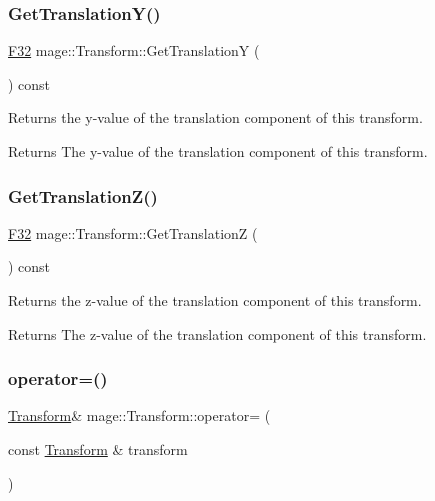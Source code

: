 \subsubsection{\texorpdfstring{Get\+Translation\+Y()}{GetTranslationY()}}
{\footnotesize\ttfamily \hyperlink{namespacemage_aa97e833b45f06d60a0a9c4fc22ae02c0}{F32} mage\+::\+Transform\+::\+Get\+TranslationY (\begin{DoxyParamCaption}{ }\end{DoxyParamCaption}) const\hspace{0.3cm}{\ttfamily [noexcept]}}

Returns the y-\/value of the translation component of this transform.

\begin{DoxyReturn}{Returns}
The y-\/value of the translation component of this transform. 
\end{DoxyReturn}
\hypertarget{structmage_1_1_transform_a2899159e8e953026bf8b6863c65f454f}{}\label{structmage_1_1_transform_a2899159e8e953026bf8b6863c65f454f} 
\subsubsection{\texorpdfstring{Get\+Translation\+Z()}{GetTranslationZ()}}
{\footnotesize\ttfamily \hyperlink{namespacemage_aa97e833b45f06d60a0a9c4fc22ae02c0}{F32} mage\+::\+Transform\+::\+Get\+TranslationZ (\begin{DoxyParamCaption}{ }\end{DoxyParamCaption}) const\hspace{0.3cm}{\ttfamily [noexcept]}}

Returns the z-\/value of the translation component of this transform.

\begin{DoxyReturn}{Returns}
The z-\/value of the translation component of this transform. 
\end{DoxyReturn}
\hypertarget{structmage_1_1_transform_a399c432b387235b3ae964bfed27ac95c}{}\label{structmage_1_1_transform_a399c432b387235b3ae964bfed27ac95c} 
\subsubsection{\texorpdfstring{operator=()}{operator=()}\hspace{0.1cm}{\footnotesize\ttfamily [1/2]}}
{\footnotesize\ttfamily \hyperlink{structmage_1_1_transform}{Transform}\& mage\+::\+Transform\+::operator= (\begin{DoxyParamCaption}\item[{const \hyperlink{structmage_1_1_transform}{Transform} \&}]{transform }\end{DoxyParamCaption})\hspace{0.3cm}{\ttfamily [default]}}

